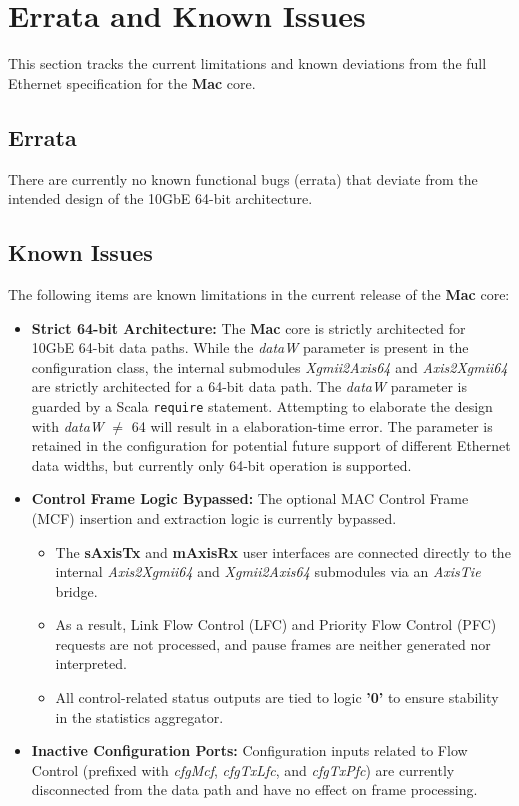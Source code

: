 \section{Errata and Known Issues}

This section tracks the current limitations and known deviations from the full Ethernet specification for the \textbf{Mac} core.

\subsection{Errata}
There are currently no known functional bugs (errata) that deviate from the intended design of the 10GbE 64-bit architecture.

\subsection{Known Issues}

The following items are known limitations in the current release of the \textbf{Mac} core:

\begin{itemize}[noitemsep]
    \item \textbf{Strict 64-bit Architecture:} 
    The \textbf{Mac} core is strictly architected for 10GbE 64-bit data paths. While the \textit{dataW} parameter is present in the configuration class, the internal submodules \textit{Xgmii2Axis64} and \textit{Axis2Xgmii64} are strictly architected for a 64-bit data path.
    The \textit{dataW} parameter is guarded by a Scala \texttt{require} statement. Attempting to elaborate the design with \textit{dataW} $\neq$ 64 will result in a elaboration-time error.
    The parameter is retained in the configuration for potential future support of different Ethernet data widths, but currently only 64-bit operation is supported.
    
    \item \textbf{Control Frame Logic Bypassed:} 
    The optional MAC Control Frame (MCF) insertion and extraction logic is currently bypassed. 
    \begin{itemize}
        \item The \textbf{sAxisTx} and \textbf{mAxisRx} user interfaces are connected directly to the internal \textit{Axis2Xgmii64} and \textit{Xgmii2Axis64} submodules via an \textit{AxisTie} bridge.
        \item As a result, Link Flow Control (LFC) and Priority Flow Control (PFC) requests are not processed, and pause frames are neither generated nor interpreted.
        \item All control-related status outputs are tied to logic \textbf{'0'} to ensure stability in the statistics aggregator.
    \end{itemize}

    \item \textbf{Inactive Configuration Ports:} 
    Configuration inputs related to Flow Control (prefixed with \textit{cfgMcf}, \textit{cfgTxLfc}, and \textit{cfgTxPfc}) are currently disconnected from the data path and have no effect on frame processing.
\end{itemize}